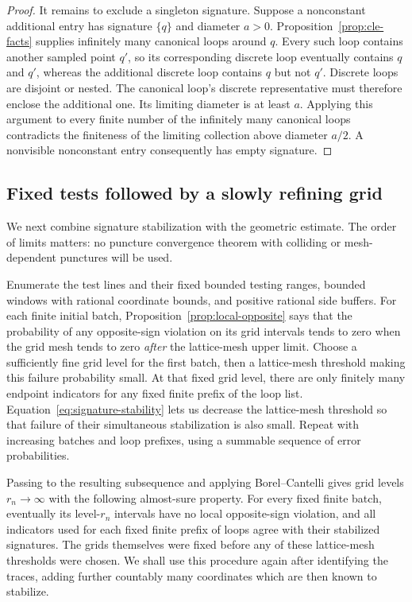 \begin{proof}
It remains to exclude a singleton signature. Suppose a nonconstant additional entry has signature $\{q\}$ and diameter $a>0$. Proposition~\ref{prop:cle-facts} supplies infinitely many canonical loops around $q$. Every such loop contains another sampled point $q'$, so its corresponding discrete loop eventually contains $q$ and $q'$, whereas the additional discrete loop contains $q$ but not $q'$. Discrete loops are disjoint or nested. The canonical loop's discrete representative must therefore enclose the additional one. Its limiting diameter is at least $a$. Applying this argument to every finite number of the infinitely many canonical loops contradicts the finiteness of the limiting collection above diameter $a/2$. A nonvisible nonconstant entry consequently has empty signature.
\end{proof}

\subsection{Fixed tests followed by a slowly refining grid}

We next combine signature stabilization with the geometric estimate. The order of limits matters: no puncture convergence theorem with colliding or mesh-dependent punctures will be used.

Enumerate the test lines and their fixed bounded testing ranges, bounded windows with rational coordinate bounds, and positive rational side buffers. For each finite initial batch, Proposition~\ref{prop:local-opposite} says that the probability of any opposite-sign violation on its grid intervals tends to zero when the grid mesh tends to zero \emph{after} the lattice-mesh upper limit. Choose a sufficiently fine grid level for the first batch, then a lattice-mesh threshold making this failure probability small. At that fixed grid level, there are only finitely many endpoint indicators for any fixed finite prefix of the loop list. Equation~\eqref{eq:signature-stability} lets us decrease the lattice-mesh threshold so that failure of their simultaneous stabilization is also small. Repeat with increasing batches and loop prefixes, using a summable sequence of error probabilities.

Passing to the resulting subsequence and applying Borel--Cantelli gives grid levels $r_n\to\infty$ with the following almost-sure property. For every fixed finite batch, eventually its level-$r_n$ intervals have no local opposite-sign violation, and all indicators used for each fixed finite prefix of loops agree with their stabilized signatures. The grids themselves were fixed before any of these lattice-mesh thresholds were chosen. We shall use this procedure again after identifying the traces, adding further countably many coordinates which are then known to stabilize.

